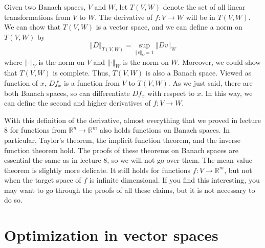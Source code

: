 \documentclass[12pt,reqno]{amsart}
\theoremstyle{definition}
\def\R{\mathbb{R}}
\newcommand{\norm}[1]{\left\Vert {#1} \right\Vert}
\renewcommand{\to}{{\rightarrow}}
\begin{document}
Given two Banach spaces, $V$ and $W$, let $T(V,W)$ denote the set of
all linear transformations from $V$ to $W$. The derivative of
 $f:V \to
W$ will be in $T(V,W)$. We can show that $T(V,W)$ is a vector space,
and we can define a norm on $T(V,W)$ by 
\[ \norm{D}_{T(V,W)} = \sup_{\norm{v}_V=1} \norm{D v}_{W} \]
where $\norm{\cdot}_V$ is the norm on $V$ and $\norm{\cdot}_W$ is the
norm on $W$. Moreover, we could show that $T(V,W)$ is complete. Thus,
$T(V,W)$ is also a Banach space. Viewed as function of $x$, $Df_x$ is
a function from $V$ to $T(V,W)$. As we just said, there are both
Banach spaces, so can differentiate $Df_x$ with respect to $x$. In 
this way, we can define the second and higher derivatives of $f:V \to
W$. 

With this definition of the derivative, almost everything that we
proved in lecture 8 for functions from $\R^n \to \R^m$ also holds
functions on Banach spaces. In particular, Taylor's theorem, the
implicit function theorem, and the inverse function theorem
hold. The proofs of these theorems on Banach spaces are essential the
same as in lecture 8, so we will not go over them. The mean value
theorem is slightly more delicate. It still holds for functions $f:V
\to \R^m$, 
but not when the target space of $f$ is infinite
dimensional. If you find this interesting, you may want to go through
the proofs of all these claims, but it is not necessary to do so.

\section{Optimization in vector spaces}
\end{document}

